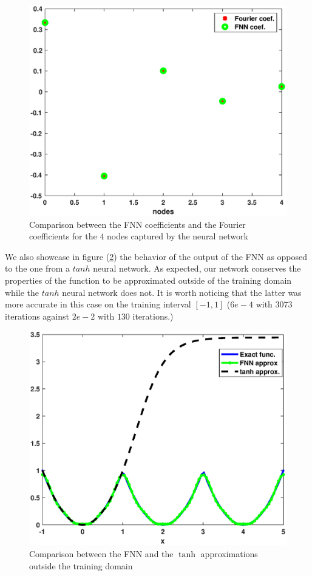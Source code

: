 \documentclass[11pt]{article}
\begin{document}
  \begin{figure}[!htb]
    \centering
    \includegraphics[width=.8\textwidth]{fnncoeffvsfourcoef.eps}
    \caption{Comparison between the FNN coefficients and the Fourier coefficients for the $4$ nodes captured by the neural network}
    \label{Fnnx2}
\end{figure}
We also showcase in figure (\ref{Fnnx2out}) the behavior of the output of the FNN as opposed to the one from a $tanh$ neural network. As expected, our network conserves the  properties of the function to be approximated outside of the training domain while the $tanh$ neural network does not. It is worth noticing that the latter was more accurate in this case on the training interval $[-1, 1]$ ($6e-4$ with $3073$ iterations against $2e-2$ with $130$ iterations.)
\begin{figure}[!htb]
    \centering
    \includegraphics[width=.8\textwidth]{fnnvstanhoutx2.eps}
    \caption{Comparison between the FNN and the $\tanh$ approximations outside the training domain}
    \label{Fnnx2out}
\end{figure}
\end{document}
